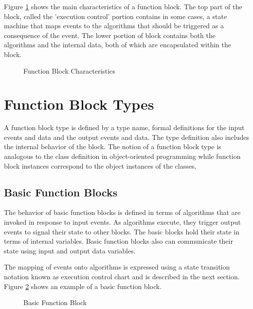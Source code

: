 Figure \ref{f:Function_Block_Char} shows the main
characteristics of a function block. The top part of the
block, called the 'execution control' portion contains in
some cases, a state machine that maps events to the
algorithms that should be triggered as a consequence of the
event. The lower portion of block contains both the
algorithms and the internal data, both of which are
encapsulated within the block.

\begin{figure}
  \begin{center}
    \caption[Function Block Characteristics]
            {Function Block Characteristics{\protect ~\cite{iec:614991:2000}}}
    \label{f:Function_Block_Char}
  \end{center}
\end{figure}




\section{Function Block Types}
A function block type is defined by a type name, formal
definitions for the input events and data and the output
events and data. The type definition also includes the
internal behavior of the block. The notion of a function
block type is analogous to the class definition in
object-oriented programming while function block instances
correspond to the object instances of the classes.

\subsection*{Basic Function Blocks} 
The behavior of basic function blocks is defined in terms of
algorithms that are invoked in response to input events. As
algorithms execute, they trigger output events to signal
their state to other blocks. The basic blocks hold their
state in terms of internal variables. Basic function blocks
also can communicate their state using input and output data
variables.
  
The mapping of events onto algorithms is expressed using a
state transition notation known as execution control chart
and is described in the next section. Figure
\ref{f:Basic_Block} shows an example of a basic function
block.

\begin{figure}
  \begin{center}
    \caption[Basic Function Block]
            {Basic Function Block{\protect ~\cite{iec:614991:2000}}} 
    \label{f:Basic_Block}
  \end{center}
\end{figure}
  
